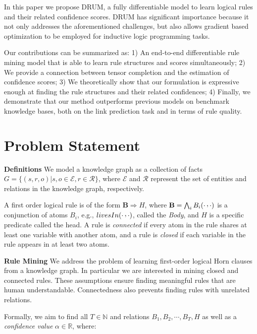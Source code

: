\documentclass{article}
\newcommand\raisepunct[1]{\,\mathpunct{\raisebox{0.5ex}{#1}}}
\begin{document}
In this paper we propose DRUM, a fully differentiable model to learn logical rules and their related confidence scores. DRUM has significant importance because it not only addresses the aforementioned challenges, but also allows gradient based optimization to be employed for inductive logic programming tasks.

Our contributions can be summarized as: 1) An end-to-end differentiable rule mining model that is able to learn rule structures and scores simultaneously; 2) We provide a connection between tensor completion and the estimation of confidence scores; 3) We theoretically show that our formulation is expressive enough at finding the rule structures and their related confidences; 
4) Finally, we demonstrate that our method outperforms previous models on benchmark knowledge bases, both on the link prediction task and in terms of rule quality.

\section{Problem Statement}
\label{sec:problem_statement}

\noindent \textbf{Definitions} \quad We model a knowledge graph as a collection of facts $G=\{(s,r,o)| s,o\in \mathcal{E}, r\in \mathcal{R} \}$, where $\mathcal{E}$ and $\mathcal{R}$ represent the set of entities and relations in the knowledge graph, respectively.

A first order logical rule is of the form $\textbf{B}\Longrightarrow H$, where $\textbf{B} = \bigwedge_i B_i(\cdot \raisepunct{,} \cdot)$ is a conjunction of atoms $B_i$, e.g., $livesIn(\cdot \raisepunct{,} \cdot)$, called the \textit{Body}, and $H$ is a specific predicate called the head. A rule is  \textit{connected} if every atom in the rule shares at least one variable with another atom, and a rule is \textit{closed} if each variable in the rule appears in at least two atoms.

\textbf{Rule Mining} \quad We address the problem of learning first-order logical Horn clauses from a knowledge graph. In particular we are interested in mining closed and connected rules. These assumptions ensure finding meaningful rules that are human understandable. Connectedness also prevents finding rules with unrelated relations.

Formally, we aim to find all $T \in \mathbb{N}$ and relations $B_1, B_2, \cdots, B_T, H$ as well as a \textit{confidence value} $\alpha \in \mathbb{R}$, where:
\end{document}
